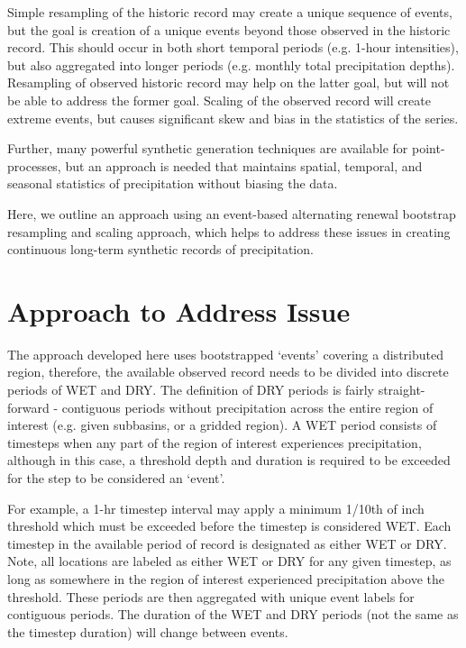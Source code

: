 \documentclass[11pt]{article} %
\begin{document}
Simple resampling of the historic record may create a unique sequence of events, but the goal is creation of a unique events beyond those observed in the historic record. This should occur in both short temporal periods (e.g. 1-hour intensities), but also aggregated into longer periods (e.g. monthly total precipitation depths). Resampling of observed historic record may help on the latter goal, but will not be able to address the former goal. Scaling of the observed record will create extreme events, but causes significant skew and bias in the statistics of the series.

Further, many powerful synthetic generation techniques are available for point-processes, but an approach is needed that maintains spatial, temporal, and seasonal statistics of precipitation without biasing the data.

Here, we outline an approach using an event-based alternating renewal bootstrap resampling and scaling approach, which helps to address these issues in creating continuous long-term synthetic records of precipitation.

\section{Approach to Address Issue}

The approach developed here uses bootstrapped ‘events’ covering a distributed region, therefore, the available observed record needs to be divided into discrete periods of WET and DRY. The definition of DRY periods is fairly straight-forward - contiguous periods without precipitation across the entire region of interest (e.g. given subbasins, or a gridded region). A WET period consists of timesteps when any part of the region of interest experiences precipitation, although in this case, a threshold depth and duration is required to be exceeded for the step to be considered an ‘event’.

For example, a 1-hr timestep interval may apply a minimum 1/10th of inch threshold which must be exceeded before the timestep is considered WET. Each timestep in the available period of record is designated as either WET or DRY. Note, all locations are labeled as either WET or DRY for any given timestep, as long as somewhere in the region of interest experienced precipitation above the threshold. These periods are then aggregated with unique event labels for contiguous periods. The duration of the WET and DRY periods (not the same as the timestep duration) will change between events. 
\end{document}
